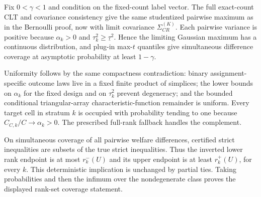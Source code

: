 Fix \(0<\gamma<1\) and condition on the fixed-count label vector.  The full exact-count CLT and covariance consistency give the same studentized pairwise maximum as in the Bernoulli proof, now with limit covariance \(\Sigma_{CR}^{(K)}\).  Each pairwise variance is positive because \(\alpha_k>0\) and \(\tau_k^2\geq\underline\tau^2\).  Hence the limiting Gaussian maximum has a continuous distribution, and plug-in max-\(t\) quantiles give simultaneous difference coverage at asymptotic probability at least \(1-\gamma\).

Uniformity follows by the same compactness contradiction: binary assignment-specific outcome laws live in a fixed finite product of simplices; the lower bounds on \(\alpha_k\) for the fixed design and on \(\tau_k^2\) prevent degeneracy; and the bounded conditional triangular-array characteristic-function remainder is uniform.  Every target cell in stratum \(k\) is occupied with probability tending to one because \(C_{C,k}/C\to\alpha_k>0\).  The prescribed full-rank fallback handles the complement.

On simultaneous coverage of all pairwise welfare differences, certified strict inequalities are subsets of the true strict inequalities.  Thus the inverted lower rank endpoint is at most \(r_k^-(U)\) and its upper endpoint is at least \(r_k^+(U)\), for every \(k\).  This deterministic implication is unchanged by partial ties.  Taking probabilities and then the infimum over the nondegenerate class proves the displayed rank-set coverage statement.